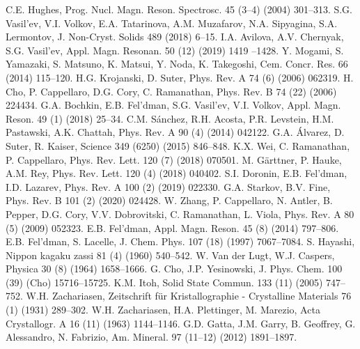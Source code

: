 \begin{thebibliography}{}
 C.E. Hughes, Prog. Nucl. Magn. Reson. Spectrosc. 45 (3–4) (2004) 301–313.
 S.G. Vasil’ev, V.I. Volkov, E.A. Tatarinova, A.M. Muzafarov, N.A. Sipyagina, S.A. Lermontov, J. Non-Cryst. Solids 489 (2018) 6–15.
 I.A. Avilova, A.V. Chernyak, S.G. Vasil’ev, Appl. Magn. Resonan. 50 (12) (2019) 1419 –1428.
 Y. Mogami, S. Yamazaki, S. Matsuno, K. Matsui, Y. Noda, K. Takegoshi, Cem. Concr. Res. 66 (2014) 115–120.
 H.G. Krojanski, D. Suter, Phys. Rev. A 74 (6) (2006) 062319.
 H. Cho, P. Cappellaro, D.G. Cory, C. Ramanathan, Phys. Rev. B 74 (22) (2006) 224434.
 G.A. Bochkin, E.B. Fel’dman, S.G. Vasil’ev, V.I. Volkov, Appl. Magn. Reson. 49 (1) (2018) 25–34.
 C.M. S\'anchez, R.H. Acosta, P.R. Levstein, H.M. Pastawski, A.K. Chattah, Phys. Rev. A 90 (4) (2014) 042122.
 G.A. \'Alvarez, D. Suter, R. Kaiser, Science 349 (6250) (2015) 846–848.
 K.X. Wei, C. Ramanathan, P. Cappellaro, Phys. Rev. Lett. 120 (7) (2018) 070501.
 M. G\"arttner, P. Hauke, A.M. Rey, Phys. Rev. Lett. 120 (4) (2018) 040402.
 S.I. Doronin, E.B. Fel’dman, I.D. Lazarev, Phys. Rev. A 100 (2) (2019) 022330.
  G.A. Starkov, B.V. Fine, Phys. Rev. B 101 (2) (2020) 024428.
 W. Zhang, P. Cappellaro, N. Antler, B. Pepper, D.G. Cory, V.V. Dobrovitski, C. Ramanathan, L. Viola, Phys. Rev. A 80 (5) (2009) 052323.
 E.B. Fel’dman, Appl. Magn. Reson. 45 (8) (2014) 797–806.
 E.B. Fel’dman, S. Lacelle, J. Chem. Phys. 107 (18) (1997) 7067–7084.
 S. Hayashi, Nippon kagaku zassi 81 (4) (1960) 540–542.
 W. Van der Lugt, W.J. Caspers, Physica 30 (8) (1964) 1658–1666.
 G. Cho, J.P. Yesinowski, J. Phys. Chem. 100 (39) (Cho) 15716–15725.
 K.M. Itoh, Solid State Commun. 133 (11) (2005) 747–752.
 W.H. Zachariasen, Zeitschrift für Kristallographie - Crystalline Materials 76 (1) (1931) 289–302.
 W.H. Zachariasen, H.A. Plettinger, M. Marezio, Acta Crystallogr. A 16 (11) (1963) 1144–1146.
 G.D. Gatta, J.M. Garry, B. Geoffrey, G. Alessandro, N. Fabrizio, Am. Mineral. 97 (11–12) (2012) 1891–1897.

\end{thebibliography}
